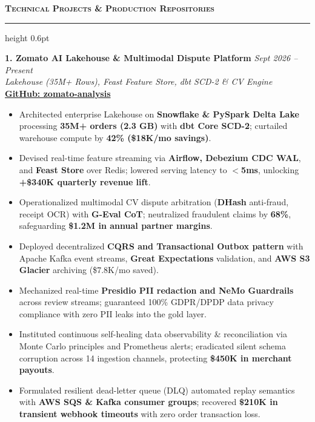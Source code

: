 \documentclass[9.5pt,a4paper]{article}
\newcommand{\resumesection}[1]{%
    \vspace{4.0pt}%
    {\color{burgundy}\scshape\bfseries\fontsize{10.0pt}{11.2pt}\selectfont #1}%
    \vspace{1.0pt}%
    \hrule height 0.6pt\relax%
    \vspace{2.5pt}%
}
\begin{document}
\resumesection{Technical Projects \& Production Repositories}

\noindent\textbf{1. Zomato AI Lakehouse \& Multimodal Dispute Platform} \hfill {\small\textit{Sept 2026 -- Present}}\\
\textit{Lakehouse (35M+ Rows), Feast Feature Store, dbt SCD-2 \& CV Engine} \hfill {\footnotesize\href{https://github.com/KishorKumarParoi/zomato-analysis}{\textbf{GitHub: zomato-analysis}}}
\begin{itemize}
    \item Architected enterprise Lakehouse on \textbf{Snowflake \& PySpark Delta Lake} processing \textbf{35M+ orders (2.3 GB)} with \textbf{dbt Core SCD-2}; curtailed warehouse compute by \textbf{42\% (\$18K/mo savings)}.
    \item Devised real-time feature streaming via \textbf{Airflow, Debezium CDC WAL}, and \textbf{Feast Store} over Redis; lowered serving latency to \textbf{$<$5ms}, unlocking \textbf{+\$340K quarterly revenue lift}.
    \item Operationalized multimodal CV dispute arbitration (\textbf{DHash} anti-fraud, receipt OCR) with \textbf{G-Eval CoT}; neutralized fraudulent claims by \textbf{68\%}, safeguarding \textbf{\$1.2M in annual partner margins}.
    \item Deployed decentralized \textbf{CQRS and Transactional Outbox pattern} with Apache Kafka event streams, \textbf{Great Expectations} validation, and \textbf{AWS S3 Glacier} archiving (\$7.8K/mo saved).
    \item Mechanized real-time \textbf{Presidio PII redaction and NeMo Guardrails} across review streams; guaranteed 100\% GDPR/DPDP data privacy compliance with zero PII leaks into the gold layer.
    \item Instituted continuous self-healing data observability \& reconciliation via Monte Carlo principles and Prometheus alerts; eradicated silent schema corruption across 14 ingestion channels, protecting \textbf{\$450K in merchant payouts}.
    \item Formulated resilient dead-letter queue (DLQ) automated replay semantics with \textbf{AWS SQS \& Kafka consumer groups}; recovered \textbf{\$210K in transient webhook timeouts} with zero order transaction loss.
\end{itemize}
\end{document}
